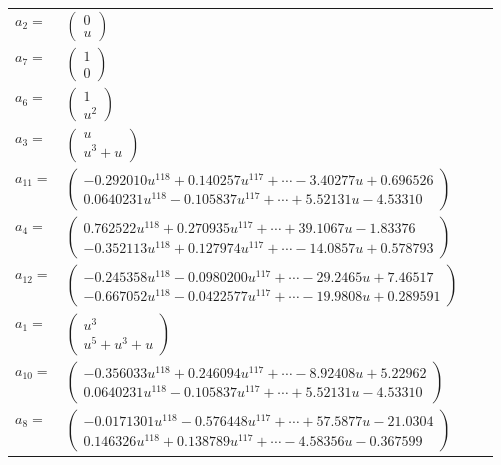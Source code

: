 \documentclass[1p]{elsarticle_modified}
\theoremstyle{definition}
\begin{document}
\begin{tabular}{m{7pt} m{180pt} m{7pt} m{180pt} }
\flushright $a_{2}=$&$\begin{pmatrix}0\\u\end{pmatrix}$ \\
\flushright $a_{7}=$&$\begin{pmatrix}1\\0\end{pmatrix}$ \\
\flushright $a_{6}=$&$\begin{pmatrix}1\\u^2\end{pmatrix}$ \\
\flushright $a_{3}=$&$\begin{pmatrix}u\\u^3+u\end{pmatrix}$ \\
\flushright $a_{11}=$&$\begin{pmatrix}-0.292010 u^{118}+0.140257 u^{117}+\cdots-3.40277 u+0.696526\\0.0640231 u^{118}-0.105837 u^{117}+\cdots+5.52131 u-4.53310\end{pmatrix}$ \\
\flushright $a_{4}=$&$\begin{pmatrix}0.762522 u^{118}+0.270935 u^{117}+\cdots+39.1067 u-1.83376\\-0.352113 u^{118}+0.127974 u^{117}+\cdots-14.0857 u+0.578793\end{pmatrix}$ \\
\flushright $a_{12}=$&$\begin{pmatrix}-0.245358 u^{118}-0.0980200 u^{117}+\cdots-29.2465 u+7.46517\\-0.667052 u^{118}-0.0422577 u^{117}+\cdots-19.9808 u+0.289591\end{pmatrix}$ \\
\flushright $a_{1}=$&$\begin{pmatrix}u^3\\u^5+u^3+u\end{pmatrix}$ \\
\flushright $a_{10}=$&$\begin{pmatrix}-0.356033 u^{118}+0.246094 u^{117}+\cdots-8.92408 u+5.22962\\0.0640231 u^{118}-0.105837 u^{117}+\cdots+5.52131 u-4.53310\end{pmatrix}$ \\
\flushright $a_{8}=$&$\begin{pmatrix}-0.0171301 u^{118}-0.576448 u^{117}+\cdots+57.5877 u-21.0304\\0.146326 u^{118}+0.138789 u^{117}+\cdots-4.58356 u-0.367599\end{pmatrix}$ \\

\end{tabular}
\end{document}
